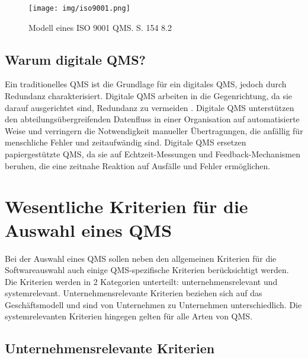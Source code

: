 \documentclass[11pt]{scrartcl}       %
\begin{document}
\begin{figure}[!htb]
	\centering
	\texttt{[image: img/iso9001.png]}
	\caption{Modell eines ISO 9001 QMS. \cite{pfeifer2021masing} S. 154 8.2}
\label{fig:qms_principles}
\end{figure}


\subsection{Warum digitale QMS?}
Ein traditionelles QMS ist die Grundlage für ein digitales QMS, jedoch durch Redundanz charakterisiert. Digitale QMS arbeiten in die Gegenrichtung, da sie darauf ausgerichtet sind, Redundanz zu vermeiden \cite{ibrahim2019digital}. Digitale QMS unterstützen den abteilungsübergreifenden Datenfluss in einer Organisation auf automatisierte Weise und verringern die Notwendigkeit manueller Übertragungen, die anfällig für menschliche Fehler und zeitaufwändig sind. Digitale QMS ersetzen papiergestützte QMS, da sie auf Echtzeit-Messungen und Feedback-Mechanismen beruhen, die eine zeitnahe Reaktion auf Ausfälle und Fehler ermöglichen. \cite{yeung2003empirical}


\section{Wesentliche Kriterien für die Auswahl eines QMS}

Bei der Auswahl eines QMS sollen neben den allgemeinen Kriterien für die Softwareauswahl auch einige QMS-spezifische Kriterien berücksichtigt werden. Die Kriterien werden in 2 Kategorien unterteilt: unternehmensrelevant und systemrelevant. Unternehmensrelevante Kriterien beziehen sich auf das Geschäftsmodell und sind von Unternehmen zu Unternehmen unterschiedlich. Die systemrelevanten Kriterien hingegen gelten für alle Arten von QMS.

\subsection{Unternehmensrelevante Kriterien}
\end{document}
